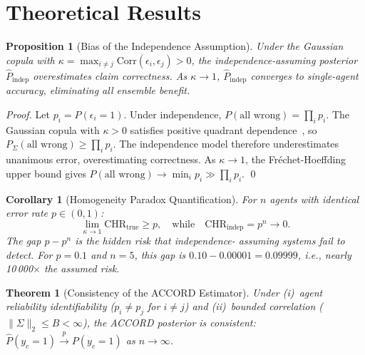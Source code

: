 \documentclass[conference]{IEEEtran}
\newtheorem{theorem}{Theorem}
\newtheorem{proposition}{Proposition}
\newtheorem{corollary}{Corollary}
\begin{document}
\section{Theoretical Results}
\label{sec:theoretical}

\begin{proposition}[Bias of the Independence Assumption]
\label{prop:bias}
Under the Gaussian copula with
$\kappa = \max_{i \neq j} \mathrm{Corr}(\epsilon_i, \epsilon_j) > 0$,
the independence-assuming posterior $\hat{P}_\text{indep}$
overestimates claim correctness.
As $\kappa \to 1$, $\hat{P}_\text{indep}$ converges to
single-agent accuracy, eliminating all ensemble benefit.
\end{proposition}

\begin{proof}
Let $p_i = P(\epsilon_i = 1)$.
Under independence,
$P(\text{all wrong}) = \prod_i p_i$.
The Gaussian copula with $\kappa > 0$ satisfies positive
quadrant dependence~\cite{nelsen2006}, so
$P_\Sigma(\text{all wrong}) \geq \prod_i p_i$.
The independence model therefore underestimates unanimous error,
overestimating correctness.
As $\kappa \to 1$, the Fréchet-Hoeffding upper bound gives
$P(\text{all wrong}) \to \min_i p_i \gg \prod_i p_i$.
\qed
\end{proof}

\begin{corollary}[Homogeneity Paradox Quantification]
\label{cor:paradox}
For $n$ agents with identical error rate $p \in (0,1)$:
\begin{equation}
  \lim_{\kappa \to 1} \mathrm{CHR}_\text{true} \geq p,
  \quad \text{while} \quad
  \mathrm{CHR}_\text{indep} = p^n \to 0.
  \label{eq:paradox}
\end{equation}
The gap $p - p^n$ is the \emph{hidden risk} that independence-
assuming systems fail to detect.
For $p = 0.1$ and $n = 5$, this gap is $0.10 - 0.00001 = 0.09999$,
i.e., nearly 10\,000$\times$ the assumed risk.
\end{corollary}

\begin{theorem}[Consistency of the ACCORD Estimator]
\label{thm:consistency}
Under (i)~agent reliability identifiability
($p_i \neq p_j$ for $i \neq j$) and
(ii)~bounded correlation ($\|\Sigma\|_2 \leq B < \infty$),
the ACCORD posterior is consistent:
$\hat{P}(y_c = 1) \xrightarrow{p} P(y_c = 1)$
as $n \to \infty$.
\end{theorem}
\end{document}
